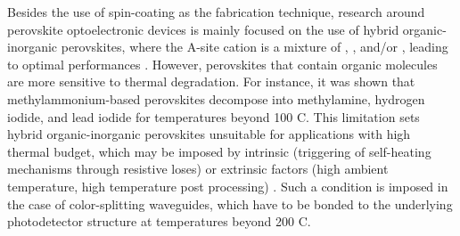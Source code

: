 Besides the use of spin-coating as the fabrication technique, research around perovskite optoelectronic devices is mainly focused on the use of hybrid organic-inorganic perovskites, where the A-site cation is a mixture of , , and/or , leading to optimal performances \cite{Zhang2021All-inorganicCells}. However, perovskites that contain organic molecules are more sensitive to thermal degradation. For instance, it was shown that methylammonium-based perovskites decompose into methylamine, hydrogen iodide, and lead iodide for temperatures beyond 100 \degree C. This limitation sets hybrid organic-inorganic perovskites unsuitable for applications with high thermal budget, which may be imposed by intrinsic (triggering of self-heating mechanisms through resistive loses) or extrinsic factors (high ambient temperature, high temperature post processing) \cite{Handa2019LargePerovskite, Dong2023GrowthFilm, Li2022StructureTemperatures}. Such a condition is imposed in the case of color-splitting waveguides, which have to be bonded to the underlying photodetector structure at temperatures beyond 200 \degree C. 

